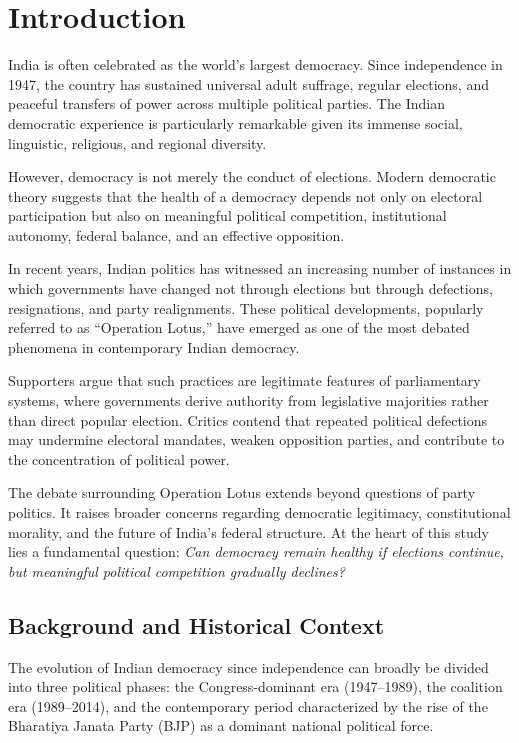 \documentclass[11pt]{article}
\begin{document}
\section{Introduction}
India is often celebrated as the world's largest democracy. Since independence in 1947, the country has sustained universal adult suffrage, regular elections, and peaceful transfers of power across multiple political parties. The Indian democratic experience is particularly remarkable given its immense social, linguistic, religious, and regional diversity.

However, democracy is not merely the conduct of elections. Modern democratic theory suggests that the health of a democracy depends not only on electoral participation but also on meaningful political competition, institutional autonomy, federal balance, and an effective opposition.

In recent years, Indian politics has witnessed an increasing number of instances in which governments have changed not through elections but through defections, resignations, and party realignments. These political developments, popularly referred to as ``Operation Lotus,'' have emerged as one of the most debated phenomena in contemporary Indian democracy.

Supporters argue that such practices are legitimate features of parliamentary systems, where governments derive authority from legislative majorities rather than direct popular election. Critics contend that repeated political defections may undermine electoral mandates, weaken opposition parties, and contribute to the concentration of political power.

The debate surrounding Operation Lotus extends beyond questions of party politics. It raises broader concerns regarding democratic legitimacy, constitutional morality, and the future of India's federal structure. At the heart of this study lies a fundamental question: \emph{Can democracy remain healthy if elections continue, but meaningful political competition gradually declines?}

\subsection{Background and Historical Context}
The evolution of Indian democracy since independence can broadly be divided into three political phases: the Congress-dominant era (1947--1989), the coalition era (1989--2014), and the contemporary period characterized by the rise of the Bharatiya Janata Party (BJP) as a dominant national political force.
\end{document}
